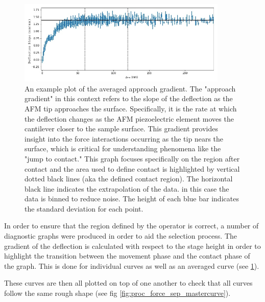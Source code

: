 \begin{figure}[h!!!!]    
        \begin{center}
          \includegraphics[width=100mm]{chapter4/gradientGraph.png}
\end{center}
\caption{An example plot of the averaged approach gradient. The "approach gradient" in this context refers to the slope of the deflection as the AFM tip approaches the surface. Specifically, it is the rate at which the deflection changes as the AFM piezoelectric element moves the cantilever closer to the sample surface. This gradient provides insight into the force interactions occurring as the tip nears the surface, which is critical for understanding phenomena like the "jump to contact." This graph focuses specifically on the region after contact and the area used to define contact is highlighted by vertical dotted black lines (aka the defined contact region). The horizontal black line indicates the extrapolation of the data. in this case the data is binned to reduce noise. The height of each blue bar indicates the standard deviation for each point.} %
\label{fig:EgAvgDeriv}                
\end{figure}

In order to ensure that the region defined by the operator is correct, a number of diagnostic graphs were produced in order to aid the selection process. The gradient of the deflection is calculated with respect to the stage height in order to highlight the transition between the movement phase and the contact phase of the graph. This is done for individual curves as well as an averaged curve (see \ref{fig:EgAvgDeriv}).

These curves are then all plotted on top of one another to check that all curves follow the same rough shape (see fig \ref{fig:proc_force_sep_mastercurve}).

